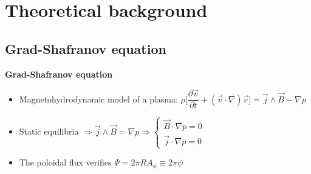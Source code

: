 \documentclass[10pt]{beamer}
\newcommand{\p}{\partial}
\begin{document}
\section{Theoretical background}

\subsection{Grad-Shafranov equation}

\begin{frame}{\bf Grad-Shafranov equation}

\begin{itemize}

\item Magnetohydrodynamic model of a plasma: $\rho \Big[\dfrac{\p \vec{v}}{\p t}+(\vec{v} \cdot \nabla)\vec{v} \Big]=\vec{j} \wedge \vec{B} -\nabla p$

\item Static equilibria $\Rightarrow \vec{j} \wedge \vec{B} = \nabla p \Rightarrow \left\{ \begin{array}{c}
\vec{B} \cdot \nabla p=0 \\
\vec{j} \cdot \nabla p=0
\end{array}\right. $

\begin{figure}[t]
\centering
{}
\hfill
{}
\end{figure}


\item The poloidal flux verifies $\Psi=2 \pi R A_\phi \equiv 2 \pi \psi$



\end{itemize}



\end{frame}
\end{document}
